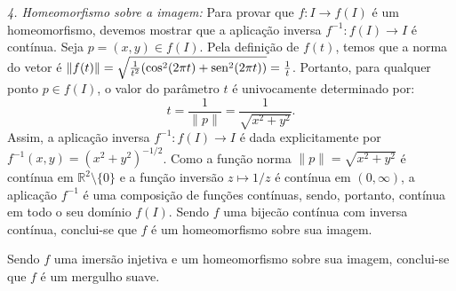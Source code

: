 {	\textit{4. Homeomorfismo sobre a imagem:} Para provar que $f : I \to f(I)$ é um homeomorfismo, devemos mostrar que a aplicação inversa $f^{-1} : f(I) \to I$ é contínua. 
	Seja $p = (x,y) \in f(I)$. Pela definição de $f(t)$, temos que a norma do vetor é $\|f(t)\| = \sqrt{\tfrac{1}{t^2}(\cos^2(2\pi t) + \operatorname{sen}^2(2\pi t))} = \tfrac{1}{t}$. 
	Portanto, para qualquer ponto $p \in f(I)$, o valor do parâmetro $t$ é univocamente determinado por:
	\begin{equation*}
		t = \frac{1}{\|p\|} = \frac{1}{\sqrt{x^2+y^2}}.
	\end{equation*}
	Assim, a aplicação inversa $f^{-1} : f(I) \to I$ é dada explicitamente por $f^{-1}(x,y) = (x^2+y^2)^{-1/2}$. 
	Como a função norma $\|p\| = \sqrt{x^2+y^2}$ é contínua em $\mathbb{R}^2 \setminus \{0\}$ e a função inversão $z \mapsto 1/z$ é contínua em $(0, \infty)$, a aplicação $f^{-1}$ é uma composição de funções contínuas, sendo, portanto, contínua em todo o seu domínio $f(I)$.
	Sendo $f$ uma bijecão contínua com inversa contínua, conclui-se que $f$ é um homeomorfismo sobre sua imagem.
	\begin{center}
	\end{center}
	
	Sendo $f$ uma imersão injetiva e um homeomorfismo sobre sua imagem, conclui-se que $f$ é um mergulho suave.
}

